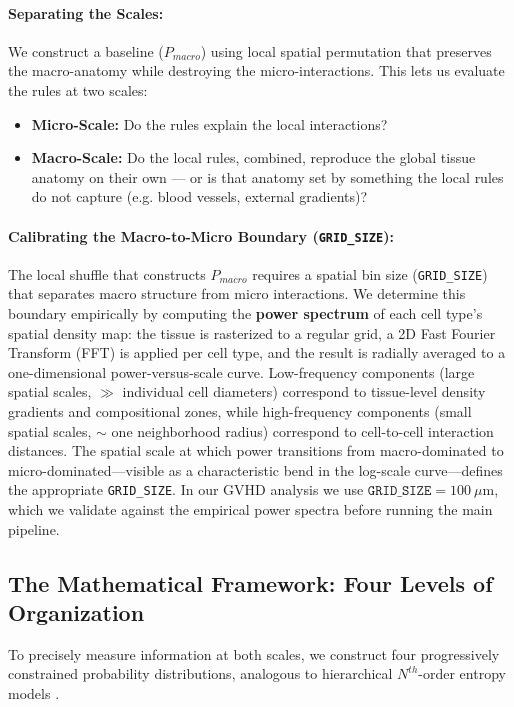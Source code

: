 \documentclass[10pt, a4paper]{article}
\begin{document}
\paragraph{Separating the Scales:} We construct a baseline ($P_{macro}$) using local spatial permutation \cite{Goltsev2018, Littman2021} that preserves the macro-anatomy while destroying the micro-interactions. This lets us evaluate the rules at two scales:
\begin{itemize}
    \item \textbf{Micro-Scale:} Do the rules explain the local interactions?
    \item \textbf{Macro-Scale:} Do the local rules, combined, reproduce the global tissue anatomy on their own — or is that anatomy set by something the local rules do not capture (e.g. blood vessels, external gradients)?
\end{itemize}

\paragraph{Calibrating the Macro-to-Micro Boundary (\texttt{GRID\_SIZE}):}
The local shuffle that constructs $P_{macro}$ requires a spatial bin size (\texttt{GRID\_SIZE}) that separates macro structure from micro interactions. We determine this boundary empirically by computing the \textbf{power spectrum} of each cell type's spatial density map: the tissue is rasterized to a regular grid, a 2D Fast Fourier Transform (FFT) is applied per cell type, and the result is radially averaged to a one-dimensional power-versus-scale curve. Low-frequency components (large spatial scales, $\gg$ individual cell diameters) correspond to tissue-level density gradients and compositional zones, while high-frequency components (small spatial scales, $\sim$ one neighborhood radius) correspond to cell-to-cell interaction distances. The spatial scale at which power transitions from macro-dominated to micro-dominated---visible as a characteristic bend in the log-scale curve---defines the appropriate \texttt{GRID\_SIZE}. In our GVHD analysis we use $\texttt{GRID\_SIZE} = 100\ \mu\text{m}$, which we validate against the empirical power spectra before running the main pipeline.

\subsection{The Mathematical Framework: Four Levels of Organization}
To precisely measure information at both scales, we construct four progressively constrained probability distributions, analogous to hierarchical $N^{th}$-order entropy models \cite[Lecture 4, pp. 63-68]{Schumacher2015}.
\end{document}
